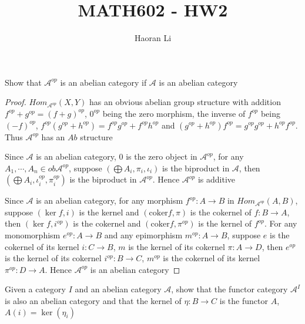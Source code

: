 \documentclass{article}
\title{MATH602 - HW2}
\author{Haoran Li}
\date{}
\newenvironment{exercise}[2][Exercise]{\begin{trivlist}
\item[\hskip \labelsep {\bfseries #1}\hskip \labelsep {\bfseries #2.}]}{\end{trivlist}}
\theoremstyle{definition}
\theoremstyle{remark}
\theoremstyle{definition}
\begin{document}
\sloppy %

\maketitle
\begin{exercise}{\textbf{A4.2}}
Show that $\mathcal A^{op}$ is an abelian category if $\mathcal A$ is an abelian category
\end{exercise}

\begin{proof}
$Hom_{\mathcal A^{op}}(X,Y)$ has an obvious abelian group structure with addition $f^{op}+g^{op}=(f+g)^{op}$, $0^{op}$ being the zero morphism, the inverse of $f^{op}$ being $(-f)^{op}$, $f^{op}(g^{op}+h^{op})=f^{op}g^{op}+f^{op}h^{op}$ and $
(g^{op}+h^{op})f^{op}=g^{op}g^{op}+h^{op}f^{op}$. Thus $\mathcal A^{op}$ has an $Ab$ structure \par
Since $\mathcal A$ is an abelian category, $0$ is the zero object in $\mathcal A^{op}$, for any $A_1,\cdots,A_n\in ob\mathcal A^{op}$, suppose $(\bigoplus A_i,\pi_i,\iota_i)$ is the biproduct in $\mathcal A$, then $(\bigoplus A_i,\iota_i^{op},\pi_i^{op})$ is the biproduct in $\mathcal A^{op}$. Hence $\mathcal A^{op}$ is additive \par
Since $\mathcal A$ is an abelian category, for any morphism $f^{op}:A\to B$ in $Hom_{\mathcal A^{op}}(A,B)$, suppose $(\ker f,i)$ is the kernel and $(\mathrm{coker}f,\pi)$ is the cokernel of $f:B\to A$, then $(\ker f,i^{op})$ is the cokernel and $(\mathrm{coker}f,\pi^{op})$ is the kernel of $f^{op}$. For any monomorphism $e^{op}:A\to B$ and any epimorphism $m^{op}:A\to B$, suppose $e$ is the cokernel of its kernel $i:C\to B$, $m$ is the kernel of its cokernel $\pi:A\to D$, then $e^{op}$ is the kernel of its cokernel $i^{op}:B\to C$, $m^{op}$ is the cokernel of its kernel $\pi^{op}:D\to A$. Hence $\mathcal A^{op}$ is an abelian category
\end{proof}

\begin{exercise}{\textbf{A4.3}}
Given a category $I$ and an abelian category $\mathcal A$, show that the functor category $\mathcal A^I$ is also an abelian category and that the kernel of $\eta:B\to C$ is the functor $A$, $A(i)=\ker(\eta_i)$
\end{exercise}
\end{document}
